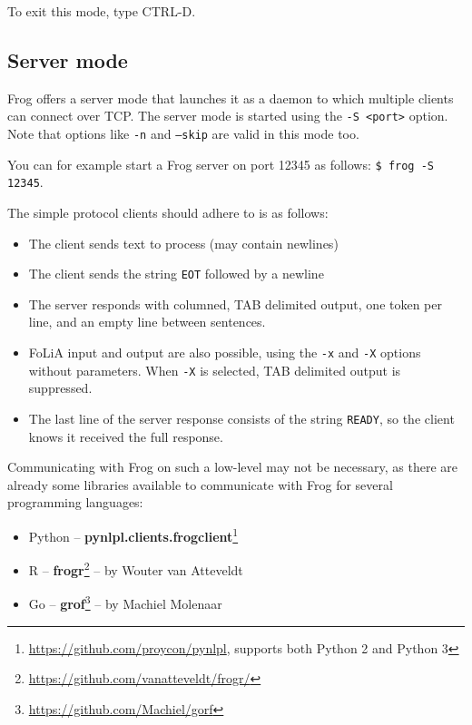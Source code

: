 \documentclass{book}
\begin{document}
To exit this mode, type CTRL-D.

\subsection{Server mode}
\label{servermode}

Frog offers a server mode that launches it as a daemon to which multiple
clients can connect over TCP. The server mode is started using the \texttt{-S
<port>} option. Note that options like \texttt{-n} and \texttt{--skip} are valid in this mode too.

You can for example start a Frog server on port 12345 as follows: \texttt{\$ frog -S 12345}.

The simple protocol clients should adhere to is as follows:

\begin{itemize}
	\item The client sends text to process (may contain newlines)
	\item The client sends the string \texttt{EOT} followed by a newline
	\item The server responds with columned, TAB delimited output, one token per line, and an empty line between sentences.
    \item FoLiA input and output are also possible, using the \texttt{-x} and \texttt{-X} options without parameters. When \texttt{-X} is selected, TAB delimited output is suppressed.
    \item The last line of the server response consists of the string \texttt{READY}, so the client knows it received the full response.
\end{itemize}

Communicating with Frog on such a low-level may not be necessary, as there are
already some libraries available to communicate with Frog for several
programming languages:

\begin{itemize}
	\item Python -- \textbf{pynlpl.clients.frogclient}\footnote{\url{https://github.com/proycon/pynlpl}, supports both Python 2 and Python 3}
	\item R -- \textbf{frogr}\footnote{\url{https://github.com/vanatteveldt/frogr/}} -- by Wouter van Atteveldt
	\item Go -- \textbf{grof}\footnote{\url{https://github.com/Machiel/gorf}} -- by Machiel Molenaar
\end{itemize}
\end{document}
